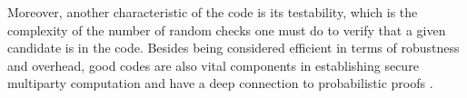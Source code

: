 Moreover, another characteristic of the code is its testability, which is the complexity of the number of random checks one must do to verify that a given candidate is in the code. Besides being considered efficient in terms of robustness and overhead, good codes are also vital components in establishing secure multiparty computation \cite{MultiParty} and have a deep connection to probabilistic proofs \cite{PCPoriginal}.

